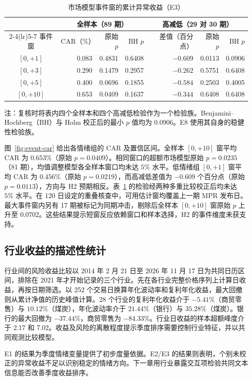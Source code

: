 \begin{table}[htbp]
  \centering\small
  \caption{市场模型事件窗的累计异常收益（E3）}
  \label{tab:event-results}
  \begin{tabular}{@{}crrrrrr@{}}
    \toprule
    & \multicolumn{3}{c}{全样本（89 期）} & \multicolumn{3}{c}{高减低（29 对 30 期）} \\
    \cmidrule(lr){2-4}\cmidrule(lr){5-7}
    事件窗 & CAR（\%） & 原始 $p$ & BH $p$ & 差值（百分点） & 原始 $p$ & BH $p$ \\
    \midrule
    $[0,+1]$  & 0.083 & 0.4831 & 0.6408 & $-0.609$ & 0.0113 & 0.0906 \\
    $[0,+3]$  & 0.290 & 0.1479 & 0.2957 & $-0.262$ & 0.5751 & 0.6408 \\
    $[0,+5]$  & 0.400 & 0.0696 & 0.1855 & $-0.584$ & 0.2503 & 0.4005 \\
    $[0,+10]$ & 0.653 & 0.0409 & 0.1637 & $-0.344$ & 0.6408 & 0.6408 \\
    \bottomrule
  \end{tabular}
  \par\smallskip
  \parbox{.92\linewidth}{\footnotesize 注：复核时将表内四个全样本和四个高减低检验作为一个检验族。Benjamini--Hochberg（BH）与 Holm 校正后的最小 $p$ 值均为 $0.0906$。E8 使用其自身的稳健性检验族。}
\end{table}

图~\ref{fig:event-car} 给出各情绪组的 CAR 及置信区间。全样本 $[0,+10]$ 窗平均 CAR 为 $0.653\%$（原始 $p=0.0409$）。相同窗口的超额市场模型原始 $p=0.0235$（81 期），均值调整模型各全样本窗口均未达 $5\%$ 水平。低情绪组 $[0,+1]$ 窗平均 CAR 为 $0.456\%$（原始 $p=0.0219$），而高减低差值为 $-0.609$ 个百分点（原始 $p=0.0113$），方向与 H2 预期相反。表~\ref{tab:event-results} 的检验经两种多重比较校正后均未达 $5\%$ 水平。在 120 日设定的重叠核查中，可用估计窗均覆盖上一期 MPR 发布日。最大事件窗内另有 17 期被标记为同期冲击，剔除后全样本 $[0,+10]$ 窗原始 $p$ 上升至 $0.0702$。这些结果提示短窗反应依赖窗口和样本选择，H2 的事件维度未获支持。


\subsection{行业收益的描述性统计}

行业间的风险收益比较以 2014 年 2 月 21 日至 2026 年 11 月 17 日为共同日历区间，排除在 2021 年才开始记录的三个行业。先在各行业完整价格序列上计算日收益，再按日期筛选。以 252 个交易日换算年化波动率和复利年化收益，最大回撤则从累计净值的历史峰值计算。28 个行业的复利年化收益介于 $-5.41\%$（商贸零售）与 $10.12\%$（煤炭），年化波动率介于 $21.44\%$（银行）与 $35.28\%$（煤炭）。银行的最大回撤为 $-37.44\%$，商贸零售为 $-84.33\%$。行业日收益的样本超额峰度介于 2.17 和 7.02。收益及风险的离散程度提示季度排序需要控制行业特征，并以共同观测比较模型。


E1 的结果为季度情绪变量提供了初步度量依据。E2/E3 的结果则表明，个别未校正的异常收益不足以识别稳定的情绪方向。下一章用行业暴露交互项检验共同文本信息能否改善季度收益排序。
